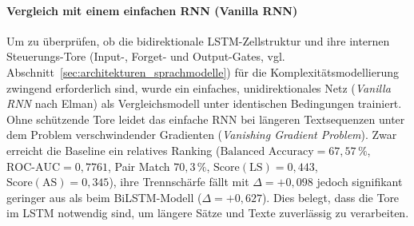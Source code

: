 \paragraph{Vergleich mit einem einfachen RNN (Vanilla RNN)}
Um zu überprüfen, ob die bidirektionale LSTM-Zellstruktur und ihre internen Steuerungs-Tore (Input-, Forget- und Output-Gates, vgl. Abschnitt~\ref{sec:architekturen_sprachmodelle}) für die Komplexitätsmodellierung zwingend erforderlich sind, wurde ein einfaches, unidirektionales Netz (\textit{Vanilla RNN} nach Elman) als Vergleichsmodell unter identischen Bedingungen trainiert. Ohne schützende Tore leidet das einfache RNN bei längeren Textsequenzen unter dem Problem verschwindender Gradienten (\textit{Vanishing Gradient Problem}). Zwar erreicht die Baseline ein relatives Ranking ($\text{Balanced Accuracy} = 67{,}57\,\%$, $\text{ROC-AUC} = 0{,}7761$, Pair Match $70{,}3\,\%$, $\text{Score}(\text{LS}) = 0{,}443$, $\text{Score}(\text{AS}) = 0{,}345$), ihre Trennschärfe fällt mit $\Delta = +0{,}098$ jedoch signifikant geringer aus als beim BiLSTM-Modell ($\Delta = +0{,}627$). Dies belegt, dass die Tore im LSTM notwendig sind, um längere Sätze und Texte zuverlässig zu verarbeiten.

